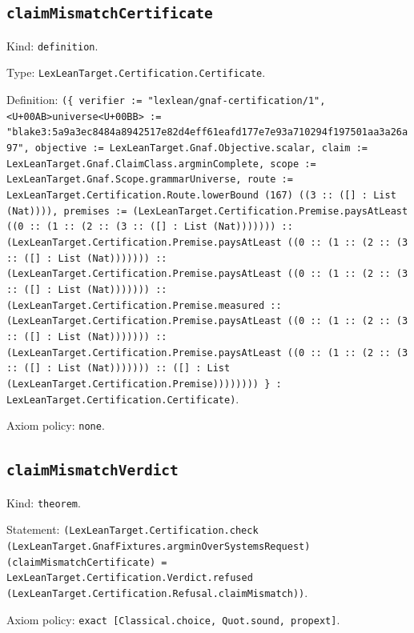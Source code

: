 \documentclass[11pt]{article}
\begin{document}
\subsection*{\texttt{claimMismatchCertificate}}
\noindent Kind: \texttt{definition}.\par
\noindent Type: \texttt{LexLeanTarget.Certification.Certificate}.\par
\noindent Definition: \texttt{(\{ verifier := "lexlean/gnaf-certification/1", <U+00AB>universe<U+00BB> := "blake3:5a9a3ec8484a8942517e82d4eff61eafd177e7e93a710294f197501aa3a26a97", objective := LexLeanTarget.Gnaf.Objective.scalar, claim := LexLeanTarget.Gnaf.ClaimClass.argminComplete, scope := LexLeanTarget.Gnaf.Scope.grammarUniverse, route := LexLeanTarget.Certification.Route.lowerBound (167) ((3 :: ([] : List (Nat)))), premises := (LexLeanTarget.Certification.Premise.paysAtLeast ((0 :: (1 :: (2 :: (3 :: ([] : List (Nat))))))) :: (LexLeanTarget.Certification.Premise.paysAtLeast ((0 :: (1 :: (2 :: (3 :: ([] : List (Nat))))))) :: (LexLeanTarget.Certification.Premise.paysAtLeast ((0 :: (1 :: (2 :: (3 :: ([] : List (Nat))))))) :: (LexLeanTarget.Certification.Premise.measured :: (LexLeanTarget.Certification.Premise.paysAtLeast ((0 :: (1 :: (2 :: (3 :: ([] : List (Nat))))))) :: (LexLeanTarget.Certification.Premise.paysAtLeast ((0 :: (1 :: (2 :: (3 :: ([] : List (Nat))))))) :: ([] : List (LexLeanTarget.Certification.Premise)))))))) \} : LexLeanTarget.Certification.Certificate)}.\par
\noindent Axiom policy: \texttt{none}.\par
\subsection*{\texttt{claimMismatchVerdict}}
\noindent Kind: \texttt{theorem}.\par
\noindent Statement: \texttt{(LexLeanTarget.Certification.check (LexLeanTarget.GnafFixtures.argminOverSystemsRequest) (claimMismatchCertificate) = LexLeanTarget.Certification.Verdict.refused (LexLeanTarget.Certification.Refusal.claimMismatch))}.\par
\noindent Axiom policy: \texttt{exact [Classical.choice, Quot.sound, propext]}.\par
\end{document}
